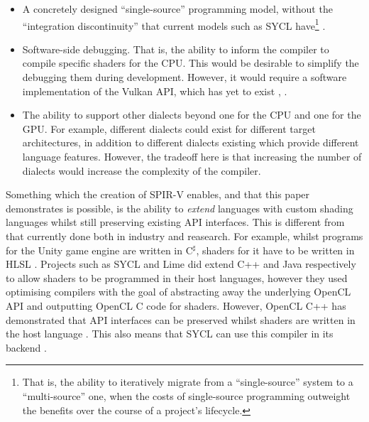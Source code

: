 \documentclass[a4paper,12pt,twoside,openright]{report}
\begin{document}
\begin{itemize}

    \item A concretely designed ``single-source'' programming model, without
    the ``integration discontinuity'' that current models such as SYCL
    have\footnote{That is, the ability to iteratively migrate from a
    ``single-source'' system to a ``multi-source'' one, when the costs of
    single-source programming outweight the benefits over the course of a
    project's lifecycle.} \cite{DesignAndEvaluateReusableComponents}.

    \item Software-side debugging. That is, the ability to inform the compiler
    to compile specific shaders for the CPU. This would be desirable to
    simplify the debugging them during development. However, it would require a
    software implementation of the Vulkan API, which has yet to exist
    \cite{VulkanCPU} \cite{Kazan}, \cite{SwiftShaderVulkan}.

    \item The ability to support other dialects beyond one for the CPU and one
    for the GPU. For example, different dialects could exist for different
    target architectures, in addition to different dialects existing which
    provide different language features. However, the tradeoff here is that
    increasing the number of dialects would increase the complexity of the
    compiler.

\end{itemize}



Something which the creation of SPIR-V enables, and that this paper
demonstrates is possible, is the ability to \textit{extend} languages with
custom shading languages whilst still preserving existing API interfaces. This
is different from that currently done both in industry and reasearch. For
example, whilst programs for the Unity game engine are written in C$^\sharp$,
shaders for it have to be written in HLSL \cite{UnityShaders}. Projects such as
SYCL and Lime did extend C++ and Java respectively to allow shaders to be
programmed in their host languages, however they used optimising compilers with
the goal of abstracting away the underlying OpenCL API and outputting OpenCL C
code for shaders. However, OpenCL C++ has demonstrated that API interfaces can
be preserved whilst shaders are written in the host language
\cite{OpenCLCPPWhitePaper}. This also means that SYCL can use this compiler in
its backend \cite{SYCL}.
\end{document}
